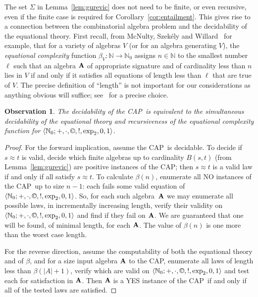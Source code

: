 \documentclass[eqnor,reqno]{amsart}
\theoremstyle{plain}
\newtheorem{obs}[thm]{Observation}
\theoremstyle{definition}
\newcommand{\cc}{\mathbin{\textup{\copyright}}}
\newcommand{\CAP}{\textsf{CAP}}
\begin{document}
The set $\Sigma$ in Lemma~\ref{lem:gurevic} does not need to be finite, or even recursive, even if the finite case is required for Corollary~\ref{cor:entailment}.  This gives rise to a connection between the combinatorial algebra problem and the decidability of the equational theory.  First recall, from McNulty, Szek\'ely and Willard~\cite{MSzW} for example, that for a variety of algebras  $V$ (or for an algebra generating $V$), the \emph{equational complexity} function $\beta_V:\mathbb{N}\to\mathbb{N}_0$ assigns $n\in \mathbb{N}$ to the smallest number $\ell$ such that an algebra ${\bf A}$ of appropriate signature and of cardinality less than $n$ lies in $V$ if and only if it satisfies all equations of length less than $\ell$ that are true of $V$.  The precise definition of ``length'' is not important for our considerations as anything obvious will suffice; see~\cite{MSzW} for a precise choice.
\begin{obs}\label{obs:decid}
The decidability of the \CAP\ is equivalent to the simultaneous decidability of the equational theory and recursiveness of the equational complexity function for $\langle \mathbb{N}_0;+,\cdot,\cc,!,\exp_2,0,1\rangle$. 
\end{obs}
\begin{proof}
For the forward implication, assume the \CAP\ is decidable.  To decide if $s\approx t$ is valid, decide which finite algebras up to cardinality $B(s,t)$ (from Lemma~\ref{lem:gurevic}) are positive instances of the \CAP;  
then $s\approx t$ is a valid law if and only if all satisfy $s\approx t$.  To calculate $\beta(n)$, enumerate all NO instances of the \CAP\ up to size $n-1$: each fails some valid equation of $\langle \mathbb{N}_0;+,\cdot,\cc,!,\exp_2,0,1\rangle$.  So, for each such algebra~${\bf A}$ we may enumerate all possible laws, in incrementally increasing length, verify their validity on $\langle \mathbb{N}_0;+,\cdot,\cc,!,\exp_2,0,1\rangle$ and find if they fail on ${\bf A}$.  We are guaranteed that one will be found, of minimal length, for each ${\bf A}$.  The value of $\beta(n)$ is one more than the worst case length.

For the reverse direction, assume the computability of both the equational theory and of $\beta$, and for a size  input algebra ${\bf A}$ to the \CAP, enumerate all laws of length less than $\beta(|A|+1)$, verify which are valid on $\langle \mathbb{N}_0;+,\cdot,\cc,!,\exp_2,0,1\rangle$ and test each for satisfaction in ${\bf A}$.  Then ${\bf A}$ is a YES instance of the \CAP\ if and only if all of the tested laws are satisfied.
\end{proof}
\end{document}

